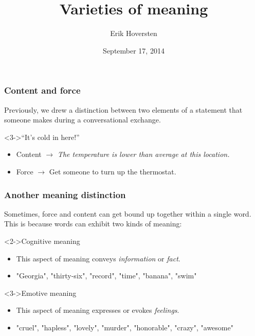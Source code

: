 \documentclass[10pt,letterpaper,xcolor=dvipsnames,handout]{beamer}
\title{Varieties of meaning}
\subtitle{}
\author[Hoversten]{Erik Hoversten}
\institute[lrp-f14]{Logic, reason, and persuasion: fall 2014 \\ Rutgers University}
\date[09/17/2014]{September 17, 2014}
\begin{document}
\begin{frame}
\titlepage
\end{frame}


\begin{frame}
\frametitle{Content and force}

Previously, we drew a distinction between two elements of a statement that someone makes during a conversational exchange.



\begin{block}<3->{``It's cold in here!''}
\begin{itemize}
  \item Content $\rightarrow$ \textit{The temperature is lower than average at this location.}
  \item Force $\rightarrow$ Get someone to turn up the thermostat.
\end{itemize}
\end{block}

\end{frame}

\begin{frame}
\frametitle{Another meaning distinction}

Sometimes, force and content can get bound up together within a single word.  This is because words can exhibit two kinds of meaning:

\begin{block}<2->{Cognitive meaning}
  \begin{itemize}
  \item This aspect of meaning conveys \textit{information} or \textit{fact}.
  \item "Georgia", "thirty-six", "record", "time", "banana", "swim"
  \end{itemize}
\end{block}

\begin{block}<3->{Emotive meaning}
  \begin{itemize}
  \item This aspect of meaning expresses or evokes \textit{feelings}.
  \item "cruel", "hapless", "lovely", "murder", "honorable", "crazy", "awesome"
  \end{itemize}
\end{block}


\end{frame}
\end{document}
